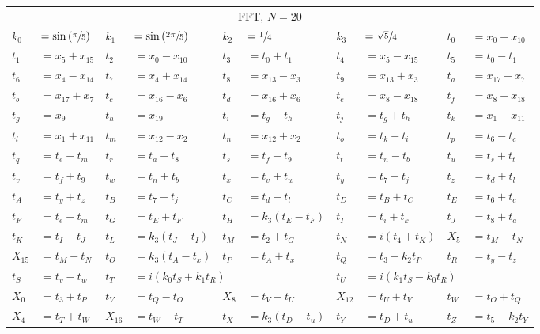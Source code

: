 \begin{tabular}{|p{4.3pt}l|p{4.3pt}l|p{4.3pt}l|p{4.3pt}l|p{4.3pt}l|}\toprule \multicolumn{10}{|c|}{FFT, $N=20$} \\
$k_0 $ &$= \sin\left(\sfrac{\pi}{5}\right)$ & $k_1 $ &$= \sin\left(\sfrac{2\pi}{5}\right)$ & $k_2 $ &$= \sfrac{1}{4}$ & $k_3 $ &$= \sfrac{\sqrt{5}}{4}$ & $t_0 $ &$= x_0 + x_{10}$\\ 
$t_1 $ &$= x_5 + x_{15}$ & $t_2 $ &$= x_0 - x_{10}$ & $t_3 $ &$= t_0 + t_1$ & $t_4 $ &$= x_5 - x_{15}$ & $t_5 $ &$= t_0 - t_1$\\ 
$t_6 $ &$= x_4 - x_{14}$ & $t_7 $ &$= x_4 + x_{14}$ & $t_8 $ &$= x_{13} - x_3$ & $t_9 $ &$= x_{13} + x_3$ & $t_a $ &$= x_{17} - x_7$\\ 
$t_b $ &$= x_{17} + x_7$ & $t_c $ &$= x_{16} - x_6$ & $t_d $ &$= x_{16} + x_6$ & $t_e $ &$= x_8 - x_{18}$ & $t_f $ &$= x_8 + x_{18}$\\ 
$t_g $ &$= x_9$ & $t_h $ &$= x_{19}$ & $t_i $ &$= t_g - t_h$ & $t_j $ &$= t_g + t_h$ & $t_k $ &$= x_1 - x_{11}$\\ 
$t_l $ &$= x_1 + x_{11}$ & $t_m $ &$= x_{12} - x_2$ & $t_n $ &$= x_{12} + x_2$ & $t_o $ &$= t_k - t_i$ & $t_p $ &$= t_6 - t_c$\\ 
$t_q $ &$= t_e - t_m$ & $t_r $ &$= t_a - t_8$ & $t_s $ &$= t_f - t_9$ & $t_t $ &$= t_n - t_b$ & $t_u $ &$= t_s + t_t$\\ 
$t_v $ &$= t_f + t_9$ & $t_w $ &$= t_n + t_b$ & $t_x $ &$= t_v + t_w$ & $t_y $ &$= t_7 + t_j$ & $t_z $ &$= t_d + t_l$\\ 
$t_A $ &$= t_y + t_z$ & $t_B $ &$= t_7 - t_j$ & $t_C $ &$= t_d - t_l$ & $t_D $ &$= t_B + t_C$ & $t_E $ &$= t_6 + t_c$\\ 
$t_F $ &$= t_e + t_m$ & $t_G $ &$= t_E + t_F$ & $t_H $ &$= k_3(t_E - t_F)$ & $t_I $ &$= t_i + t_k$ & $t_J $ &$= t_8 + t_a$\\ 
$t_K $ &$= t_I + t_J$ & $t_L $ &$= k_3(t_J - t_I)$ & $t_M $ &$= t_2 + t_G$ & $t_N $ &$= i(t_4 + t_K)$ & $X_5 $ &$= t_M - t_N$\\ 
$X_{15} $ &$= t_M + t_N$ & $t_O $ &$= k_3(t_A - t_x)$ & $t_P $ &$= t_A + t_x$ & $t_Q $ &$= t_3 - k_2t_P$ & $t_R $ &$= t_y - t_z$\\ 
$t_S $ &$= t_v - t_w$ & $t_T $ &\multicolumn{3}{l|}{$= i(k_0t_S + k_1t_R)$} & $t_U $ &\multicolumn{3}{l|}{$= i(k_1t_S - k_0t_R)$}\\ 
$X_0 $ &$= t_3 + t_P$ & $t_V $ &$= t_Q - t_O$ & $X_8 $ &$= t_V - t_U$ & $X_{12} $ &$= t_U + t_V$ & $t_W $ &$= t_O + t_Q$\\ 
$X_4 $ &$= t_T + t_W$ & $X_{16} $ &$= t_W - t_T$ & $t_X $ &$= k_3(t_D - t_u)$ & $t_Y $ &$= t_D + t_u$ & $t_Z $ &$= t_5 - k_2t_Y$\\ 

\end{tabular}
